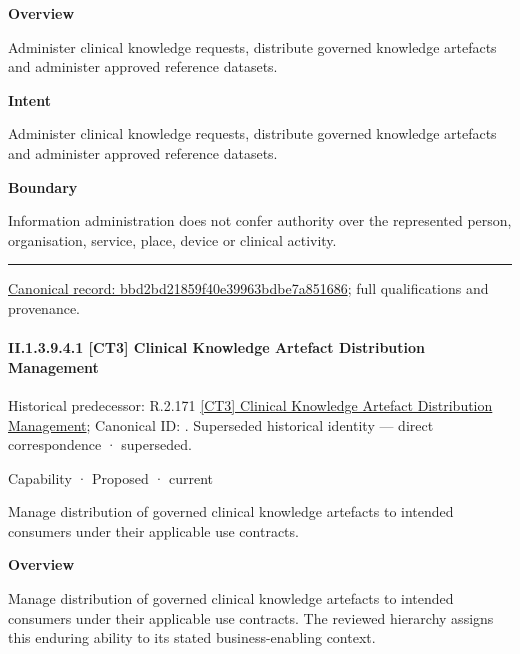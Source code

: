 \textbf{Overview}



Administer clinical knowledge requests, distribute governed knowledge artefacts and administer approved reference datasets.



\textbf{Intent}



Administer clinical knowledge requests, distribute governed knowledge artefacts and administer approved reference datasets.



\textbf{Boundary}



Information administration does not confer authority over the represented person, organisation, service, place, device or clinical activity.



\medskip\hrule\medskip

{\footnotesize \href{../../../../../../../continuum/strategy/capability/bbd2bd21859f40e39963bdbe7a851686.md}{Canonical record: bbd2bd21859f40e39963bdbe7a851686}; full qualifications and provenance.}\par
\paragraph*{II.1.3.9.4.1 [CT3] Clinical Knowledge Artefact Distribution Management}
\label{navigation:II.1.3.9.4.1}

{\small Historical predecessor: R.2.171 \hyperref[element:d81e0d6d76014066a682e3d9e03e5f8a]{[CT3] Clinical Knowledge Artefact Distribution Management}; Canonical ID: \texttt{}. Superseded historical identity — direct correspondence · superseded.}\par
\label{element:cd29a9eb798949bc8bc81bb5d434cabf}
{\small Capability · Proposed · current}\par

Manage distribution of governed clinical knowledge artefacts to intended consumers under their applicable use contracts.



\textbf{Overview}



Manage distribution of governed clinical knowledge artefacts to intended consumers under their applicable use contracts. The reviewed hierarchy assigns this enduring ability to its stated business-enabling context.



